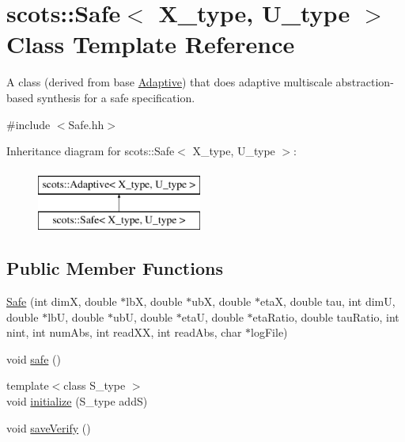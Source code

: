 \hypertarget{classscots_1_1Safe}{}\section{scots\+:\+:Safe$<$ X\+\_\+type, U\+\_\+type $>$ Class Template Reference}
\label{classscots_1_1Safe}


A class (derived from base \hyperlink{classscots_1_1Adaptive}{Adaptive}) that does adaptive multiscale abstraction-\/based synthesis for a safe specification.  




{\ttfamily \#include $<$Safe.\+hh$>$}

Inheritance diagram for scots\+:\+:Safe$<$ X\+\_\+type, U\+\_\+type $>$\+:\begin{figure}[H]
\begin{center}
\leavevmode
\includegraphics[height=2.000000cm]{classscots_1_1Safe}
\end{center}
\end{figure}
\subsection*{Public Member Functions}
\begin{DoxyCompactItemize}
\item 
\hyperlink{classscots_1_1Safe_a40024a9098c70cebc5842a09b46448b8}{Safe} (int dimX, double $\ast$lbX, double $\ast$ubX, double $\ast$etaX, double tau, int dimU, double $\ast$lbU, double $\ast$ubU, double $\ast$etaU, double $\ast$eta\+Ratio, double tau\+Ratio, int nint, int num\+Abs, int read\+XX, int read\+Abs, char $\ast$log\+File)
\item 
void \hyperlink{classscots_1_1Safe_af5ea22ef6bd1f86dd1a6f7ef6e590492}{safe} ()
\item 
{\footnotesize template$<$class S\+\_\+type $>$ }\\void \hyperlink{classscots_1_1Safe_af43dd97d2d0a63b06b72e9a435e70fcf}{initialize} (S\+\_\+type addS)
\item 
void \hyperlink{classscots_1_1Safe_ab6866ae8860c91feb49467556f0a8598}{save\+Verify} ()
\end{DoxyCompactItemize}
